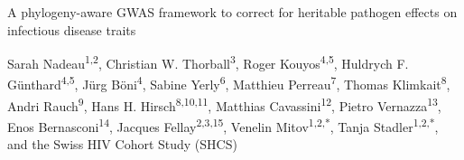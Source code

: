 \documentclass[]{article}
\begin{document}
\begin{center}
	\Large{A phylogeny-aware GWAS framework to correct for heritable pathogen effects on infectious disease traits}
\end{center}
\vspace{4pt}

\begin{flushleft}
	Sarah Nadeau\textsuperscript{1,2}, Christian W. Thorball\textsuperscript{3}, Roger Kouyos\textsuperscript{4,5}, Huldrych F. Günthard\textsuperscript{4,5}, Jürg Böni\textsuperscript{4}, Sabine Yerly\textsuperscript{6}, Matthieu Perreau\textsuperscript{7}, Thomas Klimkait\textsuperscript{8}, Andri Rauch\textsuperscript{9}, Hans H. Hirsch\textsuperscript{8,10,11}, Matthias Cavassini\textsuperscript{12}, Pietro Vernazza\textsuperscript{13}, Enos Bernasconi\textsuperscript{14}, Jacques Fellay\textsuperscript{2,3,15}, Venelin Mitov\textsuperscript{1,2,*}, Tanja Stadler\textsuperscript{1,2,*}, and the Swiss HIV Cohort Study (SHCS)
\end{flushleft}
\end{document}
